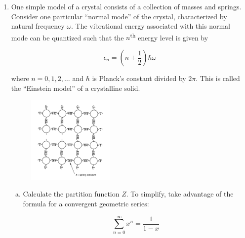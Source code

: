 \begin{enumerate}
    \pagebreak

  \item One simple model of a crystal consists of a collection of
    masses and springs. Consider one particular
    “normal mode” of the crystal, characterized by natural frequency
    $\omega$. The vibrational energy associated
    with this normal mode can be quantized such that the
    $n$\textsuperscript{th} energy level is given by

    \begin{equation*}
      \epsilon_n = \left(n + \frac{1}{2}\right)\hbar \omega
    \end{equation*}

    where $n = 0, 1, 2, \dots$ and $\hbar$ is Planck’s constant
    divided by $2\pi$. This is called the “Einstein model”
    of a crystalline solid.

    \begin{figure}[h]
      \centering
      \includegraphics[width=0.4\textwidth]{./assets/fig_2.png}
    \end{figure}

    \begin{enumerate}[(a)]

      \item Calculate the partition function $Z$. To simplify, take
        advantage of the formula for a convergent
        geometric series:

        \begin{equation*}
          \sum_{n=0}^\infty x^n = \frac{1}{1 - x}
        \end{equation*}



\end{enumerate}
\end{enumerate}
